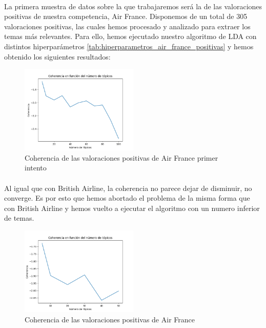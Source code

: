 \documentclass{report}
\begin{document}
{{                    \paragraph*{}{
                        La primera muestra de datos sobre la que trabajaremos será la de las valoraciones positivas de nuestra competencia, Air France.
                        Disponemos de un total de 305 valoraciones positivas, las cuales hemos procesado y analizado para extraer los temas más relevantes.
                        Para ello, hemos ejecutado nuestro algoritmo de LDA con distintos hiperparámetros \ref{tab:hiperparametros_air_france_positivas} y hemos obtenido los siguientes resultados:
                    }
                    \begin{figure}[H]
                        \centering
                        \includegraphics[width=0.5\textwidth]{./img/air_france_positivas1.png}
                        \caption{Coherencia de las valoraciones positivas de Air France primer intento}
                    \end{figure}
                    \paragraph*{}{
                        Al igual que con British Airline, la coherencia no parece dejar de disminuir, no converge.
                        Es por esto que hemos abortado el problema de la misma forma que con British Airline y hemos vuelto a ejecutar el algoritmo con un numero inferior de temas.
                    }
                    \begin{figure}[H]
                        \centering
                        \includegraphics[width=0.5\textwidth]{./img/air_france_positivas2.png}
                        \caption{Coherencia de las valoraciones positivas de Air France}
                    \end{figure}
}}
\end{document}
